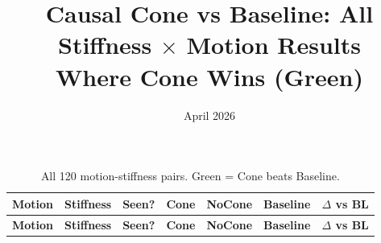 \documentclass[9pt]{article}
\title{Causal Cone vs Baseline: All Stiffness $\times$ Motion Results\\Where Cone Wins (Green)}
\author{}
\date{April 2026}
\begin{document}
\maketitle

\small

\begin{longtable}{llr|rrr|r}
\caption{All 120 motion-stiffness pairs. \colorbox{win}{Green} = Cone beats Baseline.} \\
\toprule
\textbf{Motion} & \textbf{Stiffness} & \textbf{Seen?} & \textbf{Cone} & \textbf{NoCone} & \textbf{Baseline} & \textbf{$\Delta$ vs BL} \\
\midrule
\endfirsthead
\toprule
\textbf{Motion} & \textbf{Stiffness} & \textbf{Seen?} & \textbf{Cone} & \textbf{NoCone} & \textbf{Baseline} & \textbf{$\Delta$ vs BL} \\
\midrule
\endhead


\end{longtable}
\end{document}

